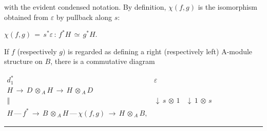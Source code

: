 \documentclass[9pt]{article}
\newcommand{\CanonText}[1]{\par{\fontsize{8.0}{9.35}\selectfont\RaggedRight #1\par}\vspace{2.2pt}}
\newcommand{\CanonDisplay}[1]{\par\vspace{1.2pt}\begin{center}{\fontsize{7.2}{8.4}\selectfont\(\displaystyle #1\)}\end{center}\vspace{1.2pt}}
\newenvironment{CanonMathBlock}{\par\vspace{1.2pt}\begin{center}\fontsize{6.8}{8.0}\selectfont\(\displaystyle}{\)\end{center}\vspace{1.2pt}}
\begin{document}
\begin{minipage}[t][\dimexpr\textheight-5pt\relax][t]{\textwidth}
\CanonText{with the evident condensed notation. By definition, \(\chi{}(f,g)\) is the isomorphism obtained from \(\varepsilon{}\) by pullback along \(s\):}
\CanonDisplay{\chi{}(f,g)\,=\,s^{*}\varepsilon{}\,:\,f^{*}H\,\simeq{}\,g^{*}H.}
\CanonText{If \(f\) (respectively \(g)\) is regarded as defining a right (respectively left) A-module structure on \(B\), there is a commutative diagram}
\begin{CanonMathBlock}
\begin{array}{ccc}
d_{1}^{*} & \varepsilon{} & {}\\
H\,\longrightarrow{}\,D\,\otimes{}_{A}\,H\,\longrightarrow{}\,H\,\otimes{}_{A}\,D & {} & {}\\
\Vert{} & \downarrow{}\,s\,\otimes{}\,1 & \downarrow{}\,1\,\otimes{}\,s\\
H\,\text{---}\,f^{*}\,\longrightarrow{}\,B\,\otimes{}_{A}\,H\,\text{---}\,\chi{}(f,g)\,\longrightarrow{}\,H\,\otimes{}_{A}\,B, & {} & {}
\end{array}
\end{CanonMathBlock}
\vfill
{\color{Accent}\hrule height 0.35pt}\vspace{3pt}
\end{minipage}
\newpage
\end{document}

